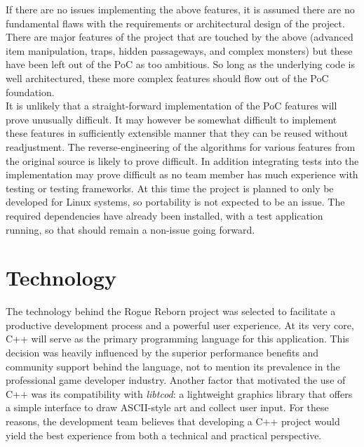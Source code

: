 \documentclass{article}
\begin{document}
If there are no issues implementing the above features, it is assumed there are no fundamental flaws with the requirements or architectural design of the project. There are major features of the project that are touched by the above (advanced item manipulation, traps, hidden passageways, and complex monsters) but these have been left out of the PoC as too ambitious. So long as the underlying code is well architectured, these more complex features should flow out of the PoC foundation.\\

It is unlikely that a straight-forward implementation of the PoC features will prove unusually difficult. It may however be somewhat difficult to implement these features in sufficiently extensible manner that they can be reused without readjustment. The reverse-engineering of the algorithms for various features from the original source is likely to prove difficult. In addition integrating tests into the implementation may prove difficult as no team member has much experience with testing or testing frameworks. At this time the project is planned to only be developed for Linux systems, so portability is not expected to be an issue. The required dependencies have already been installed, with a test application running, so that should remain a non-issue going forward. 

\section{Technology}

The technology behind the Rogue Reborn project was selected to facilitate a productive development process and a powerful user experience. At its very core, C++ will serve as the primary programming language for this application.  This decision was heavily influenced by the superior performance benefits and community support behind the language, not to mention its prevalence in the professional game developer industry.  Another factor that motivated the use of C++ was its compatibility with \textit{libtcod}: a lightweight graphics library that offers a simple interface to draw ASCII-style art and collect user input.  For these reasons, the development team believes that developing a C++ project would yield the best experience from both a technical and practical perspective.\\
\end{document}
